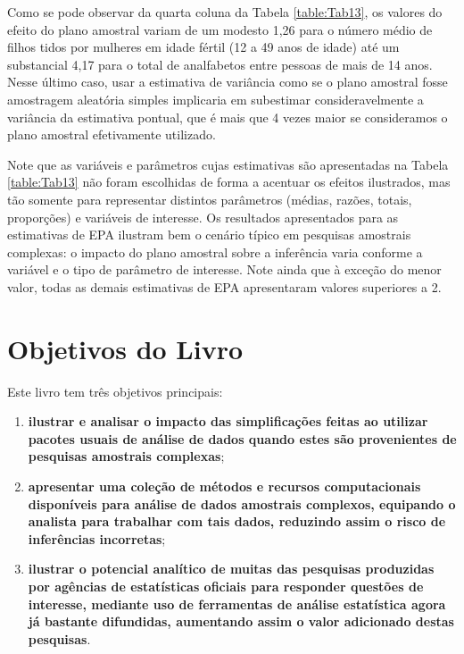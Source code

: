 \documentclass[]{book}
\numberwithin{example}{chapter}
\numberwithin{remark}{chapter}
\numberwithin{definition}{chapter}
\begin{document}
Como se pode observar da quarta coluna da Tabela \ref{table:Tab13}, os
valores do efeito do plano amostral variam de um modesto 1,26 para o
número médio de filhos tidos por mulheres em idade fértil (12 a 49 anos
de idade) até um substancial 4,17 para o total de analfabetos entre
pessoas de mais de 14 anos. Nesse último caso, usar a estimativa de
variância como se o plano amostral fosse amostragem aleatória simples
implicaria em subestimar consideravelmente a variância da estimativa
pontual, que é mais que 4 vezes maior se consideramos o plano amostral
efetivamente utilizado.

Note que as variáveis e parâmetros cujas estimativas são apresentadas na
Tabela \ref{table:Tab13} não foram escolhidas de forma a acentuar os
efeitos ilustrados, mas tão somente para representar distintos
parâmetros (médias, razões, totais, proporções) e variáveis de
interesse. Os resultados apresentados para as estimativas de EPA
ilustram bem o cenário típico em pesquisas amostrais complexas: o
impacto do plano amostral sobre a inferência varia conforme a variável e
o tipo de parâmetro de interesse. Note ainda que à exceção do menor
valor, todas as demais estimativas de EPA apresentaram valores
superiores a 2.

\section{Objetivos do Livro}\label{objetivos-do-livro}

Este livro tem três objetivos principais:

\begin{enumerate}
\def\labelenumi{\arabic{enumi})}
\item
  \textbf{ilustrar e analisar o impacto das simplificações feitas ao
  utilizar pacotes usuais de análise de dados quando estes são
  provenientes de pesquisas amostrais complexas};
\item
  \textbf{apresentar uma coleção de métodos e recursos computacionais
  disponíveis para análise de dados amostrais complexos, equipando o
  analista para trabalhar com tais dados, reduzindo assim o risco de
  inferências incorretas};
\item
  \textbf{ilustrar o potencial analítico de muitas das pesquisas
  produzidas por agências de estatísticas oficiais para responder
  questões de interesse, mediante uso de ferramentas de análise
  estatística agora já bastante difundidas, aumentando assim o valor
  adicionado destas pesquisas}.
\end{enumerate}
\end{document}
